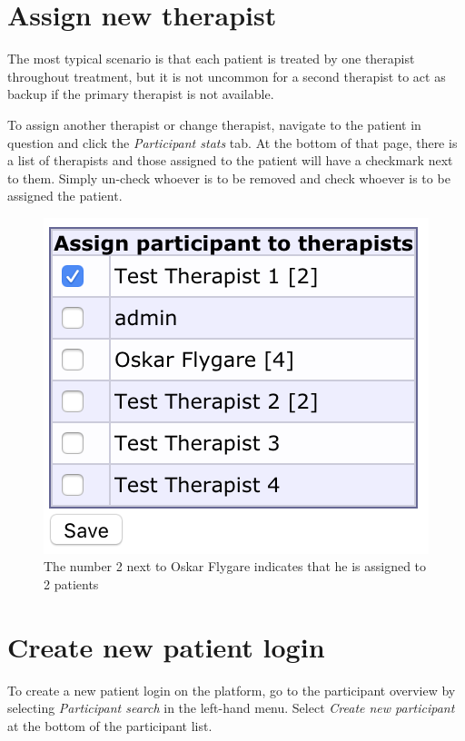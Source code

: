 \documentclass[]{book}
\theoremstyle{definition}
\theoremstyle{definition}
\theoremstyle{definition}
\theoremstyle{remark}
\begin{document}
\hypertarget{assign-new-therapist}{%
\section{Assign new therapist}\label{assign-new-therapist}}

The most typical scenario is that each patient is treated by one
therapist throughout treatment, but it is not uncommon for a second
therapist to act as backup if the primary therapist is not available.

To assign another therapist or change therapist, navigate to the patient
in question and click the \emph{Participant stats} tab. At the bottom of
that page, there is a list of therapists and those assigned to the
patient will have a checkmark next to them. Simply un-check whoever is
to be removed and check whoever is to be assigned the patient.

\begin{figure}
\centering
\includegraphics{images/assign-therapist.png}
\caption{The number 2 next to Oskar Flygare indicates that he is
assigned to 2 patients}
\end{figure}

\hypertarget{create-new-patient-login}{%
\section{Create new patient login}\label{create-new-patient-login}}

To create a new patient login on the platform, go to the participant
overview by selecting \emph{Participant search} in the left-hand menu.
Select \emph{Create new participant} at the bottom of the participant
list.
\end{document}
